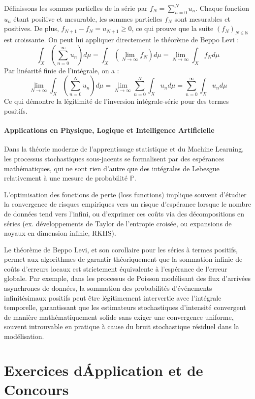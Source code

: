 \documentclass[11pt,a4paper]{article}
\begin{document}
Définissons les sommes partielles de la série par $f_N = \sum_{n=0}^N u_n$.
Chaque fonction $u_n$ étant positive et mesurable, les sommes partielles $f_N$ sont mesurables et positives.
De plus, $f_{N+1} - f_N = u_{N+1} \ge 0$, ce qui prouve que la suite $(f_N)_{N \in \mathbb{N}}$ est croissante.
On peut lui appliquer directement le théorème de Beppo Levi :
$$\int_X \left( \sum_{n=0}^\infty u_n \right) d\mu = \int_X \left( \lim_{N \to \infty} f_N \right) d\mu = \lim_{N \to \infty} \int_X f_N d\mu$$
Par linéarité finie de l'intégrale, on a :
$$\lim_{N \to \infty} \int_X \left( \sum_{n=0}^N u_n \right) d\mu = \lim_{N \to \infty} \sum_{n=0}^N \int_X u_n d\mu = \sum_{n=0}^\infty \int_X u_n d\mu$$
Ce qui démontre la légitimité de l'inversion intégrale-série pour des termes positifs.

\subsection*{Applications en Physique, Logique et Intelligence Artificielle}

Dans la théorie moderne de l'apprentissage statistique et du Machine Learning, les processus stochastiques sous-jacents se formalisent par des espérances mathématiques, qui ne sont rien d'autre que des intégrales de Lebesgue relativement à une mesure de probabilité $\mathbb{P}$.

L'optimisation des fonctions de perte (loss functions) implique souvent d'étudier la convergence de risques empiriques vers un risque d'espérance lorsque le nombre de données tend vers l'infini, ou d'exprimer ces coûts via des décompositions en séries (ex. développements de Taylor de l'entropie croisée, ou expansions de noyaux en dimension infinie, RKHS).

Le théorème de Beppo Levi, et son corollaire pour les séries à termes positifs, permet aux algorithmes de garantir théoriquement que la sommation infinie de coûts d'erreurs locaux est strictement équivalente à l'espérance de l'erreur globale. Par exemple, dans les processus de Poisson modélisant des flux d'arrivées asynchrones de données, la sommation des probabilités d'événements infinitésimaux positifs peut être légitimement intervertie avec l'intégrale temporelle, garantissant que les estimateurs stochastiques d'intensité convergent de manière mathématiquement solide sans exiger une convergence uniforme, souvent introuvable en pratique à cause du bruit stochastique résiduel dans la modélisation.

\newpage
\part{Exercices d\'Application et de Concours}
\end{document}
